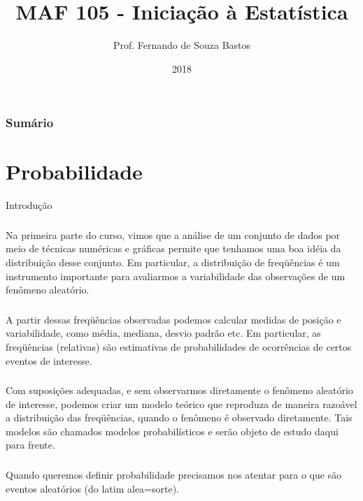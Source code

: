 \documentclass[14pt,aspectratio=1610]{beamer}
\title{MAF 105 - Iniciação à Estatística}
\author{Prof. Fernando de Souza Bastos}
\institute{Instituto de Ciências Exatas e Tecnológicas\texorpdfstring{\\ Universidade Federal de Viçosa}{}\texorpdfstring{\\ Campus UFV - Florestal}{}}
\date{2018}
\begin{document}


\frame{\titlepage}

\begin{frame}{}
\frametitle{\bf Sumário}
\tableofcontents
\end{frame}

\section{Probabilidade}
\begin{frame}{Introdução}
\frametitle{}
\begin{block}{}
\justifying
Na primeira parte do curso, vimos que a análise de um conjunto de dados por
meio de técnicas numéricas e gráficas permite que tenhamos uma boa idéia da distribuição desse conjunto. Em particular, a distribuição de freqüências é um instrumento
importante para avaliarmos a variabilidade das observações de um fenômeno aleatório.
\end{block}
\end{frame}

\begin{frame}{}
\frametitle{}
\begin{block}{}
\justifying
A partir dessas freqüências observadas podemos calcular medidas de posição e
variabilidade, como média, mediana, desvio padrão etc. Em particular, as freqüências (relativas) são estimativas de probabilidades de ocorrências
de certos eventos de interesse.
\end{block}
\end{frame}

\begin{frame}{}
\frametitle{}
\begin{block}{}
\justifying
Com suposições adequadas, e sem observarmos diretamente o fenômeno aleatório de interesse, podemos criar um modelo teórico que reproduza de maneira razoável a distribuição das freqüências, quando o fenômeno é observado diretamente. Tais modelos são chamados modelos probabilísticos e serão objeto de estudo daqui para frente.
\end{block}
\end{frame}

\begin{frame}{}
\frametitle{}
\begin{block}{}
\justifying
Quando queremos definir probabilidade precisamos nos atentar para o que são eventos aleatórios (do latim alea=sorte). 

\end{block}
\end{frame}
\end{document}
